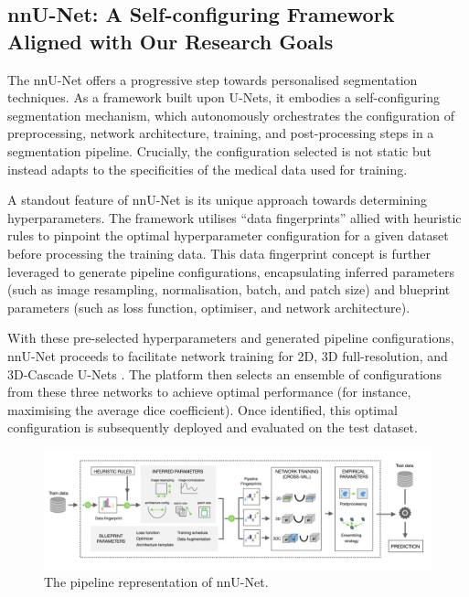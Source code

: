 \subsection{nnU-Net: A Self-configuring Framework Aligned with Our Research Goals}
The nnU-Net \cite{isensee2021nnu} offers a progressive step towards personalised segmentation techniques. As a framework built upon U-Nets, it embodies a self-configuring segmentation mechanism, which autonomously orchestrates the configuration of preprocessing, network architecture, training, and post-processing steps in a segmentation pipeline. Crucially, the configuration selected is not static but instead adapts to the specificities of the medical data used for training. 

A standout feature of nnU-Net is its unique approach towards determining hyperparameters. The framework utilises “data fingerprints” allied with heuristic rules to pinpoint the optimal hyperparameter configuration for a given dataset before processing the training data. This data fingerprint concept is further leveraged to generate pipeline configurations, encapsulating inferred parameters (such as image resampling, normalisation, batch, and patch size) and blueprint parameters (such as loss function, optimiser, and network architecture).

With these pre-selected hyperparameters and generated pipeline configurations, nnU-Net proceeds to facilitate network training for 2D, 3D full-resolution, and 3D-Cascade U-Nets \cite{isensee2018nnu}. The platform then selects an ensemble of configurations from these three networks to achieve optimal performance (for instance, maximising the average dice coefficient). Once identified, this optimal configuration is subsequently deployed and evaluated on the test dataset.

\begin{figure}[htp]
    \centering
    \includegraphics[width=\textwidth]{./figures/nnunet.png}
    \caption{The pipeline representation of nnU-Net.}
    \label{fig:nnu-net}
\end{figure}

